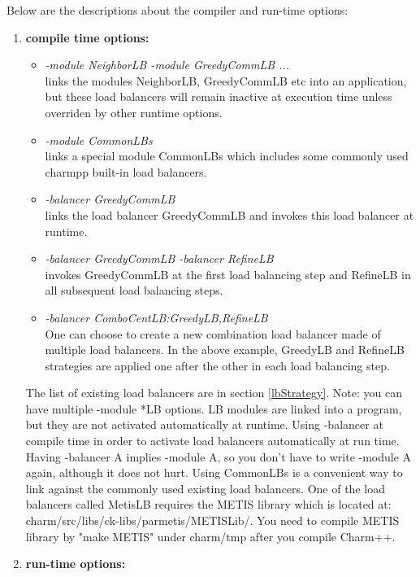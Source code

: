 Below are the descriptions about the compiler and run-time options:

\begin{enumerate}
\item {\bf compile time options:}

\begin{itemize}
\item {\em -module NeighborLB -module GreedyCommLB ...}  \\
  links the modules NeighborLB, GreedyCommLB etc into an application, but these
load balancers will remain inactive at execution time unless overriden by other
runtime options.
\item {\em -module CommonLBs} \\
  links a special module CommonLBs which includes some commonly used charmpp{}
built-in load balancers.
\item {\em -balancer GreedyCommLB} \\
  links the load balancer GreedyCommLB and invokes this load balancer at
runtime.
\item {\em -balancer GreedyCommLB -balancer RefineLB} \\
  invokes GreedyCommLB at the first load balancing step and RefineLB in all
subsequent load balancing steps.
\item {\em -balancer ComboCentLB:GreedyLB,RefineLB}  \\
  One can choose to create a new combination load balancer made of multiple
load balancers. In the above example, GreedyLB and RefineLB strategies are
applied one after the other in each load balancing step.
\end{itemize}

The list of existing load balancers are in section \ref{lbStrategy}. Note: you
can have multiple -module *LB options. LB modules are linked into a program,
but they are not activated automatically at runtime.  Using -balancer at
compile time in order to activate load balancers automatically at run time.
Having -balancer A implies -module A, so you don't have to write -module A
again, although it does not hurt.  Using CommonLBs is a convenient way to link
against the commonly used existing load balancers.  One of the load balancers
called MetisLB requires the METIS library which is located at:
charm/src/libs/ck-libs/parmetis/METISLib/.  You need to compile METIS library
by "make METIS" under charm/tmp after you compile Charm++.

\item {\bf run-time options:}


\end{enumerate}
